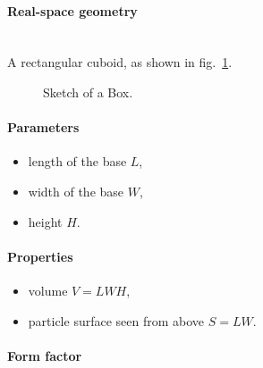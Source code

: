 \paragraph{Real-space geometry}\strut\\
A rectangular cuboid, as shown in fig.~\ref{fig:box}. 

\begin{figure}[ht]
\hfill
{}
\hfill
{}
\hfill
\caption{Sketch of a Box.}
\label{fig:box}
\end{figure}

\FloatBarrier

\paragraph{Parameters}
\begin{itemize}
\item length of the base $L$,
\item width of the base $W$,
\item height  $H$.
\end{itemize}

\paragraph{Properties}
\begin{itemize}
\item volume $V= LWH$,
\item particle surface seen from above $S = LW$.
\end{itemize}

\paragraph{Form factor}

